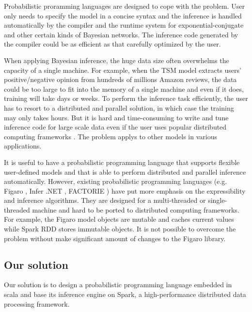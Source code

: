 Probabilistic proramming languages are designed to cope with the problem.  User
only needs to specify the model in a concise syntax and the inference is
handled automatically by the compiler and the runtime system for
exponential-conjugate and other certain kinds of Bayesian networks.  The
inference code generated by the compiler could be as efficient as that
carefully optimized by the user.


When applying Bayesian inference, the huge data size often overwhelms the
capacity of a single machine. For example, when the TSM model extracts users'
positive/negative opinion from hundreds of millions Amazon reviews, the data
could be too large to fit into the memory of a single machine and even if it
does, training will take days or weeks. To perform the inference task
efficiently, the user has to resort to a distributed and parallel solution, in
which case the training may only takes hours. But it is hard and
time-consuming to write and tune inference code for large scale data even if
the user uses popular distributed computing frameworks \cite{Cai2014}. The
problem applys to other models in various applications.

It is useful to have a probabilistic programming language that supports
flexible user-defined models and that is able to perform distributed and
parallel inference automatically. However, existing probabilistic programming
languages (e.g. Figaro \cite{pfeffer2009figaro}, Infer .NET \cite{InferNET14},
FACTORIE \cite{McCallum2009}) have put more emphasis on the expressibility and
inference algorithms. They are designed for a multi-threaded or
single-threaded machine and hard to be ported to distributed computing
frameworks. For example, the Figaro model objects are mutable and caches
current values while Spark RDD stores immutable objects. It is not possible to
overcome the problem without make significant amount of changes to the Figaro
library.

\subsection{Our solution}

Our solution is to design a probabilistic programming language embedded in
scala and base its inference engine on Spark, a high-performance distributed
data processing framework.

